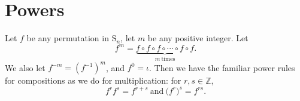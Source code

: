 \documentclass[11pt,dvipsnames]{book}
\numberwithin{equation}{section} %
\numberwithin{figure}{section} %
\numberwithin{table}{section} %
\begin{document}
%
%
%
%
%
%





\section{Powers}

 Let $f$ be any permutation in $\mathrm{S}_n$,  let
$m$ be any positive integer.  Let
$$
f^{m}=\underbrace{f\circ f\circ f\circ\cdots\circ f\circ f}_{m\ \mathrm{times}}.%
$$
We also let $f^{-m}=(f^{-1})^m$,  and $f^{0}=\iota$. Then we have the familiar power rules for compositions as we do for multiplication: for $r,s\in\mathbb{Z}$,
$$
f^{r}f^{s}=f^{r+s}\  \text{and}\  \Big(f^{r}\Big)^{s}=f^{rs}.
$$
\end{document}
